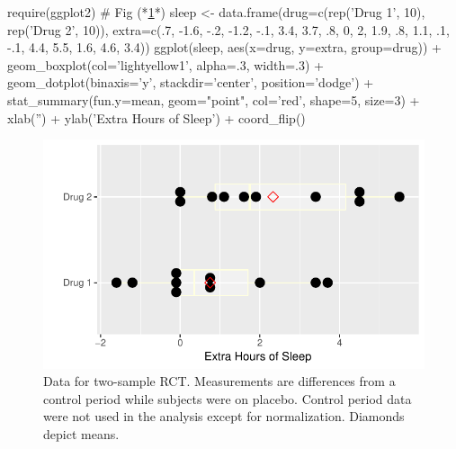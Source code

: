 \begin{Schunk}
\begin{Sinput}
require(ggplot2)   # Fig (*\ref{fig:htest-sleepa}*)
sleep <- data.frame(drug=c(rep('Drug 1', 10), rep('Drug 2', 10)),
                    extra=c(.7, -1.6, -.2, -1.2, -.1, 3.4, 3.7, .8, 0, 2,
                      1.9, .8, 1.1, .1, -.1, 4.4, 5.5, 1.6, 4.6, 3.4))
ggplot(sleep, aes(x=drug, y=extra, group=drug)) +
  geom_boxplot(col='lightyellow1', alpha=.3, width=.3) + 
  geom_dotplot(binaxis='y', stackdir='center', position='dodge') +
  stat_summary(fun.y=mean, geom="point", col='red', shape=5, size=3) +
  xlab('') + ylab('Extra Hours of Sleep') + coord_flip() 
\end{Sinput}
\begin{figure}[htbp]

\centerline{\includegraphics{htest-sleepa-1} }

\caption[Two-sample parallel group RCT]{Data for two-sample RCT.  Measurements are differences from a control period while subjects were on placebo.  Control period data were not used in the analysis except for normalization.  Diamonds depict means.}\label{fig:htest-sleepa}
\end{figure}
\end{Schunk}

